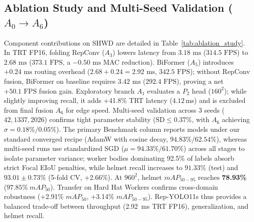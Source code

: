 \documentclass[conference]{IEEEtran}
\begin{document}
\subsection{Ablation Study and Multi-Seed Validation ($A_0 \rightarrow A_6$)}
\label{subsec:ablation}
Component contributions on SHWD are detailed in Table~\ref{tab:ablation_study}. In TRT FP16, folding RepConv ($A_3$) lowers latency from $3.18\text{~ms}$ ($314.5\text{~FPS}$) to $2.68\text{~ms}$ ($373.1\text{~FPS}$, a $-0.50\text{~ms}$ MAC reduction). BiFormer ($A_5$) introduces $+0.24\text{~ms}$ routing overhead ($2.68 + 0.24 = 2.92\text{~ms}$, $342.5\text{~FPS}$); without RepConv fusion, BiFormer on baseline requires $3.42\text{~ms}$ ($292.4\text{~FPS}$), proving a net $+50.1\text{~FPS}$ fusion gain. Exploratory branch $A_1$ evaluates a $P_2$ head ($160^2$); while slightly improving recall, it adds +41.8\% TRT latency ($4.12$\,ms) and is excluded from final fusion $A_6$ for edge speed. Multi-seed validation across 3 seeds ($42, 1337, 2026$) confirms tight parameter stability ($\mathrm{SD} \le 0.37\%$, with $A_6$ achieving $\sigma = 0.18\% / 0.05\%$). The primary Benchmark column reports models under our standard converged recipe (AdamW with cosine decay, $94.83\%/62.54\%$), whereas multi-seed runs use standardized SGD ($\mu=94.33\%/61.70\%$) across all stages to isolate parameter variance; worker bodies dominating 92.5\% of labels absorb strict Focal EIoU penalties, while helmet recall increases to $91.33\%$ (test) and $\mathbf{93.01 \pm 0.73\%}$ (5-fold CV, +2.66\%). At $960^2$, helmet $mAP_{50-95}$ reaches \textbf{78.93\%} ($97.85\%~mAP_{50}$). Transfer on Hard Hat Workers confirms cross-domain robustness (+2.91\% $mAP_{50}$, +3.14\% $mAP_{50-95}$). Rep-YOLO11s thus provides a balanced trade-off between throughput (2.92~ms TRT FP16), generalization, and helmet recall.
\end{document}
